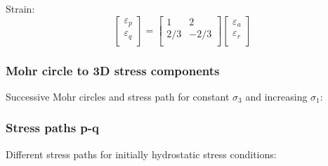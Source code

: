\documentclass[notes]{beamer}
\begin{document}
\begin{frame}
{Strain:
\begin{equation}
	\begin{bmatrix}
		\varepsilon_p \\
		\varepsilon_q \\
	\end{bmatrix}%
	=%
	\begin{bmatrix}
		1   &  2\\
		2/3   & -2/3\\
	\end{bmatrix}%
	\begin{bmatrix}
		\varepsilon_a \\
		\varepsilon_r \\
	\end{bmatrix}%
\end{equation}
}
\end{frame}


\begin{frame}
\frametitle{Mohr circle to 3D stress components}
Successive Mohr circles and stress path for constant $\sigma_3$ and increasing $\sigma_1$:
\end{frame}


\begin{frame}
\frametitle{Stress paths p-q}
Different stress paths for initially hydrostatic stress conditions:
\end{frame}
\end{document}
